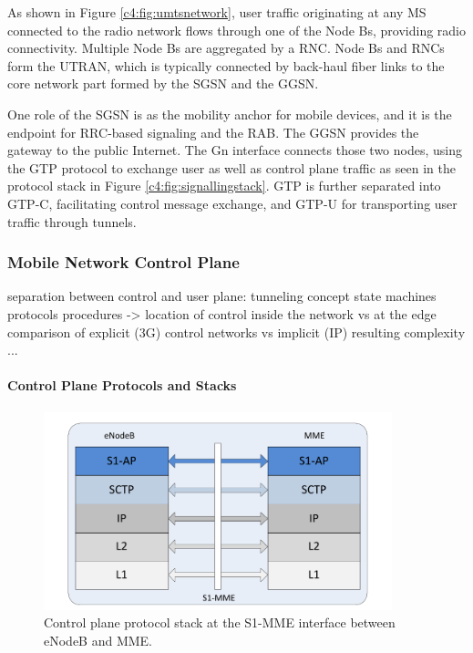 As shown in Figure \ref{c4:fig:umtsnetwork}, user traffic originating at any \gls{MS} connected to the radio network flows through one of the Node Bs, providing radio connectivity. Multiple Node Bs are aggregated by a \gls{RNC}. Node Bs and \glspl{RNC} form the \gls{UTRAN}, which is typically connected by back-haul fiber links to the core network part formed by the \gls{SGSN} and the \gls{GGSN}.

One role of the \gls{SGSN} is as the mobility anchor for mobile devices, and it is the endpoint for \gls{RRC}-based signaling and the \gls{RAB}. The \gls{GGSN} provides the gateway to the public Internet. The Gn interface connects those two nodes, using the \gls{GTP} protocol to exchange user as well as control plane traffic as seen in the protocol stack in Figure \ref{c4:fig:signallingstack}. \gls{GTP} is further separated into GTP-C, facilitating control message exchange, and GTP-U for transporting user traffic through tunnels.


\subsubsection{Mobile Network Control Plane}

separation between control and user plane: tunneling concept
state machines
protocols
procedures -> location of control inside the network vs at the edge
comparison of explicit (3G) control networks vs implicit (IP)
resulting complexity
...


\paragraph{Control Plane Protocols and Stacks}

\begin{figure}[htb]
	\centering
 	\includegraphics[width=0.9\textwidth]{images/eNB-MME-layers.pdf}
 	\caption{Control plane protocol stack at the S1-MME interface between eNodeB and MME.}
 	\label{c4:fig:stack-enbmme}
\end{figure}


